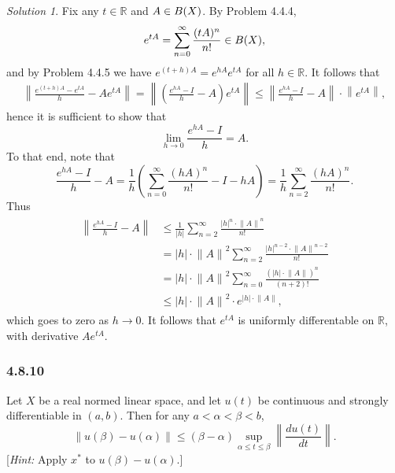 \documentclass{report}
\newcommand{\bb}[1]{\mathbb{#1}}
\newcommand{\norm}[1]{{\lVert #1 \rVert}}
\newcommand{\snorm}[1]{\left\lVert #1 \right\rVert}
\let\sc\relax
\newcommand{\sc}[1]{\mathscr{#1}}
\theoremstyle{remark}
\newtheorem*{solution}{Solution}
\begin{document}
\begin{solution}
  Fix any $t \in \bb R$ and $A \in \sc B(X)$. By Problem 4.4.4,
  \begin{equation*}
    e^{tA} = \sum_{n=0}^\infty \frac{(tA)^n}{n!} \in \sc B(X),
  \end{equation*}
  and by Problem 4.4.5 we have $e^{(t+h)A} = e^{hA} e^{tA}$ for all $h \in \bb R$. It follows that
  \begin{equation*}
    \begin{split}
      \snorm{\frac{e^{(t+h)A} - e^{tA}}{h} - A e^{tA}} = \snorm{\left( \frac{e^{hA} - I}{h} - A \right) e^{tA}} \le \snorm{\frac{e^{hA} - I}{h} - A} \cdot \snorm{e^{tA}},
    \end{split}
  \end{equation*}
  hence it is sufficient to show that
  \begin{equation*}
    \lim_{h \to 0} \frac{e^{hA} - I}{h} = A.
  \end{equation*}
  To that end, note that
  \begin{equation*}
    \frac{e^{hA} - I}{h} - A = \frac{1}{h} \left( \sum_{n=0}^\infty \frac{(hA)^n}{n!} - I - hA \right) = \frac{1}{h} \sum_{n=2}^\infty \frac{(hA)^n}{n!}.
  \end{equation*}
  Thus
  \begin{equation*}
    \begin{split}
      \begin{split}
        \snorm{\frac{e^{hA} - I}{h} - A} &\le \frac{1}{|h|} \sum_{n=2}^\infty \frac{|h|^n \cdot \norm A^n}{n!} \\
        &= |h| \cdot \norm A^2 \sum_{n=2}^\infty \frac{|h|^{n-2} \cdot \norm A^{n-2}}{n!} \\
        &= |h| \cdot \norm A^2 \sum_{n=0}^\infty \frac{(|h| \cdot \norm A)^n}{(n+2)!} \\
        &\le |h| \cdot \norm A^2 \cdot e^{|h| \cdot \norm A},
      \end{split}
    \end{split}
  \end{equation*}
  which goes to zero as $h \to 0$. It follows that $e^{tA}$ is uniformly differentable on $\bb R$, with derivative $A e^{tA}$.
\end{solution}

\subsubsection*{4.8.10}
Let $X$ be a real normed linear space, and let $u(t)$ be continuous and strongly differentiable in $(a,b)$. Then for any $a < \alpha < \beta < b$,
\begin{equation*}
  \norm{u(\beta) - u(\alpha)} \le (\beta - \alpha) \sup_{\alpha \le t \le \beta} \snorm{\frac{du(t)}{dt}}.
\end{equation*}
[\emph{Hint:} Apply $x^*$ to $u(\beta) - u(\alpha)$.]
\end{document}

